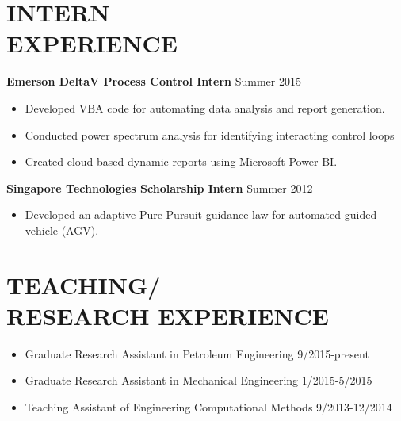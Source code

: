 \documentclass[margin, 9pt]{res} %
\begin{document}
\begin{resume}
\section{INTERN\\ EXPERIENCE}

{\textbf{Emerson DeltaV Process Control Intern}} \hfill{Summer 2015}\\
\vspace*{-10pt}
\begin{itemize}[leftmargin=*] \itemsep -3pt
\vspace*{-5pt}
	\item Developed VBA code for automating data analysis and report generation.
	\item Conducted power spectrum analysis for identifying interacting control loops
	\item Created cloud-based dynamic reports using Microsoft Power BI.
\end{itemize}

\medskip
{\textbf{Singapore Technologies Scholarship Intern}} \hfill{Summer 2012}\\
\vspace*{-10pt}
\begin{itemize}[leftmargin=*] \itemsep -3pt
\vspace*{-5pt}
	\item Developed an adaptive Pure Pursuit guidance law for automated guided vehicle (AGV).
\end{itemize}


\section{TEACHING/\\RESEARCH EXPERIENCE}
\begin{itemize}[leftmargin=*] \itemsep -2pt
\vspace*{-5pt}
	\item Graduate Research Assistant in Petroleum Engineering \hfill{9/2015-present}
	\item Graduate Research Assistant in Mechanical Engineering \hfill{1/2015-5/2015}
	\item Teaching Assistant of Engineering Computational Methods \hfill{9/2013-12/2014}
\end{itemize}


\end{resume}
\end{document}
